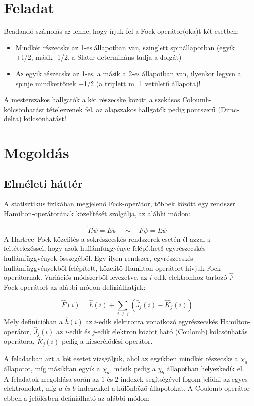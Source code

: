 \section*{Feladat}
Beadandó számolás az lenne, hogy írjuk fel a Fock-operátor(oka)t két esetben:

\begin{itemize}
	\item Mindkét részecske az 1-es állapotban van, szinglett spinállapotban (egyik +1/2, másik -1/2, a Slater-determináns tudja a dolgát)
	\item Az egyik részecske az 1-es, a másik a 2-es állapotban van, ilyenkor legyen a spinje mindkettőnek +1/2 (a triplett m=1 vetületű állapota)!
\end{itemize}
A mesterszakos hallgatók a két részecske között a szokásos Coloumb-kölcsönhatást tételezzenek fel, az alapszakos hallgatók pedig pontszerű (Dirac-delta) kölcsönhatást!

\section*{Megoldás}

\subsection*{Elméleti háttér}
A statisztikus fizikában megjelenő Fock-operátor, többek között egy rendszer Hamilton-operátorának közelítését szolgálja, az alábbi módon:

\begin{equation} \label{eq:1}
	\hat{H} \psi = E \psi
	\quad\sim\quad
	\hat{F} \psi = E \psi
\end{equation}
A Hartree--Fock-közelítés a sokrészecskés rendszerek esetén él azzal a feltételezéssel, hogy azok hullámfüggvénye felépíthető egyrészecskés hullámfüggvények összegéből. Egy ilyen rendszer, egyrészecskés hullámfüggvényekből felépített, közelítő Hamilton-operátort hívjuk Fock-operátornak. Variációs módszerből levezetve, az $i$-edik elektronhoz tartozó $\hat{F}$ Fock-operátort az alábbi módon definiálhatjuk:

\begin{equation} \label{eq:2}
	\hat{F} \left( i \right)
	=
	\hat{h} \left( i \right)
	+
	\sum_{j\,\neq\,i} \left( \hat{J}_{j} \left( i \right) - \hat{K}_{j} \left( i \right) \right)
\end{equation}
Mely definícióban a $\hat{h} \left( i \right)$ az $i$-edik elektronra vonatkozó egyrészecskés Hamilton-operátor, $\hat{J}_{j} \left( i \right)$ az $i$-edik és $j$-edik elektron között ható (Coulomb) kölcsönhatás operátora, $\hat{K}_{j} \left( i \right)$ pedig a kicserélődési operátor. \par
A feladatban azt a két esetet vizsgáljuk, ahol az egyikben mindkét részecske a $\chi_{a}$ állapotot, míg másikban egyik a $\chi_{a}$, másik pedig a $\chi_{b}$ állapotban helyezkedik el. A feladatok megoldása során az $1$ és $2$ indexek segítségével fogom jelölni az egyes elektronokat, míg $a$ és $b$ indexekkel a különböző állapotokat. A Coulomb-operátor ebben a jelölésben definiálható az alábbi módon:

